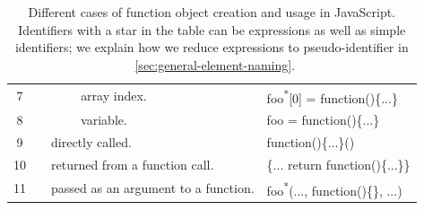 \documentclass[10pt, preprint]{sigplanconf}
\begin{document}
\begin{table}
{\begin{tabular}{ | c | l | l | l | m{2.5cm} | l|}
   7 &
   &
   & \multicolumn{2}{|l|}{
      array index.}
   & foo\textsuperscript{*}[0] = function()\{...\} \\
   \cline{0-0}\cline{4-6} 

   8 &
   & 
   & \multicolumn{2}{|l|}{
      variable.}
   & foo = function()\{...\} \\
   \cline{0-0}\cline{3-6} 
   
   9 &
   & \multicolumn{3}{|m{3.8cm}|}{
     \raggedright directly called.}
   & function()\{...\}() \\
   \cline{0-0}\cline{3-6} 

   10 &
   & \multicolumn{3}{|m{3.5cm}|}{
     \raggedright returned from a function call.}
   & \{... return function()\{...\}\} \\
   \cline{0-0}\cline{3-6} 

   11 &
   & \multicolumn{3}{|m{3.5cm}|}{
     \raggedright passed as an argument to a function.}
   & foo\textsuperscript{*}(..., function()\{\}, ...) \\
   \hline 

  \end{tabular}
 }
\caption{Different cases of function object creation and usage in JavaScript.  Identifiers with a star in the table can be expressions as well as simple identifiers; we explain how we reduce expressions to pseudo-identifier in ~\ref{sec:general-element-naming}.}
\label{table:function-types} 
\end{table}
\end{document}
